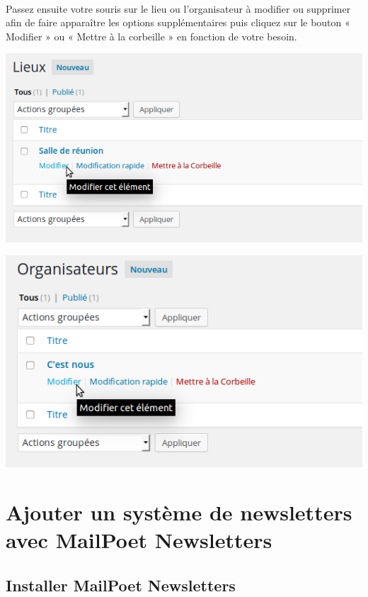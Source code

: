\documentclass[10pt,a4paper]{article}
\begin{document}
\paragraph{}Passez ensuite votre souris sur le lieu ou l'organisateur à modifier ou supprimer afin de faire apparaître les options supplémentaires puis cliquez sur le bouton « Modifier » ou « Mettre à la corbeille » en fonction de votre besoin.
\begin{center}
\includegraphics[scale=0.3]{img/0203.png}
\end{center}
\begin{center}
\includegraphics[scale=0.3]{img/0204.png}
\end{center}
\newpage
\section{Ajouter un système de newsletters avec MailPoet Newsletters}
\subsection{Installer MailPoet Newsletters}
\end{document}
